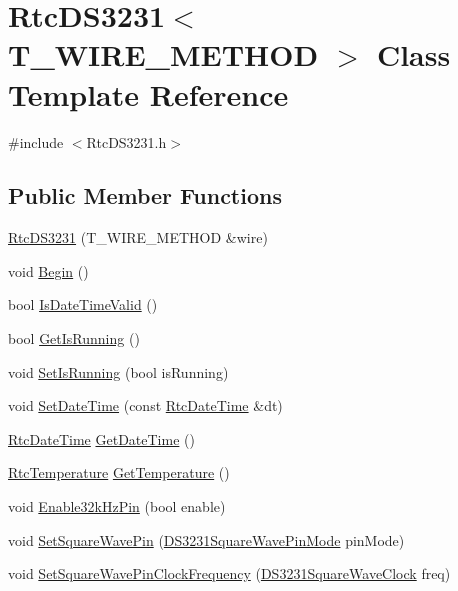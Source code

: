 \hypertarget{class_rtc_d_s3231}{}\section{Rtc\+D\+S3231$<$ T\+\_\+\+W\+I\+R\+E\+\_\+\+M\+E\+T\+H\+OD $>$ Class Template Reference}
\label{class_rtc_d_s3231}


{\ttfamily \#include $<$Rtc\+D\+S3231.\+h$>$}

\subsection*{Public Member Functions}
\begin{DoxyCompactItemize}
\item 
\hyperlink{class_rtc_d_s3231_ad0c02c5ff38211356ca99811fd66c635}{Rtc\+D\+S3231} (T\+\_\+\+W\+I\+R\+E\+\_\+\+M\+E\+T\+H\+OD \&wire)
\item 
void \hyperlink{class_rtc_d_s3231_a6e73ff9b1b19547bda25edcd3334f516}{Begin} ()
\item 
bool \hyperlink{class_rtc_d_s3231_a9f1e6af640d8d04c940d5d8dda50518a}{Is\+Date\+Time\+Valid} ()
\item 
bool \hyperlink{class_rtc_d_s3231_a86c5819d995bbc266600e1029678d072}{Get\+Is\+Running} ()
\item 
void \hyperlink{class_rtc_d_s3231_a77c1e1702c02bc7ba153a61b2ed53f6d}{Set\+Is\+Running} (bool is\+Running)
\item 
void \hyperlink{class_rtc_d_s3231_ae09f481a1826b6ed4dd1295db39ea656}{Set\+Date\+Time} (const \hyperlink{class_rtc_date_time}{Rtc\+Date\+Time} \&dt)
\item 
\hyperlink{class_rtc_date_time}{Rtc\+Date\+Time} \hyperlink{class_rtc_d_s3231_a4e71a193291a996b9ccace5ce28cde59}{Get\+Date\+Time} ()
\item 
\hyperlink{class_rtc_temperature}{Rtc\+Temperature} \hyperlink{class_rtc_d_s3231_a534ddb82645de3407a6ffb8a2c92b3d0}{Get\+Temperature} ()
\item 
void \hyperlink{class_rtc_d_s3231_a81a90021b65a50a92ec6176bd1a5860c}{Enable32k\+Hz\+Pin} (bool enable)
\item 
void \hyperlink{class_rtc_d_s3231_a3a2f094b81eac446ba0a02354213eebb}{Set\+Square\+Wave\+Pin} (\hyperlink{_rtc_d_s3231_8h_a4203fa3e3c40492217bc8de3cc077eee}{D\+S3231\+Square\+Wave\+Pin\+Mode} pin\+Mode)
\item 
void \hyperlink{class_rtc_d_s3231_af2a88ca0e3aa1f85ee8dfba2f5ea00bd}{Set\+Square\+Wave\+Pin\+Clock\+Frequency} (\hyperlink{_rtc_d_s3231_8h_a5d785d7ce9800d856044079fed07aa35}{D\+S3231\+Square\+Wave\+Clock} freq)

\end{DoxyCompactItemize}
